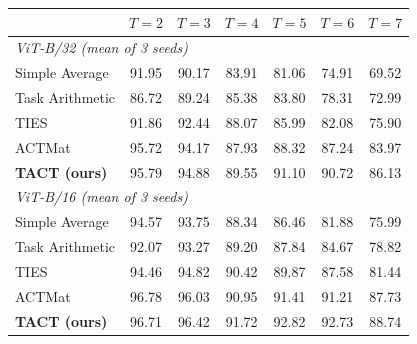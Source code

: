 \begin{tabular}{lcccccc}
\toprule
 & $T=2$ & $T=3$ & $T=4$ & $T=5$ & $T=6$ & $T=7$ \\
\midrule
\multicolumn{7}{l}{\emph{ViT-B/32 (mean of 3 seeds)}} \\
Simple Average & 91.95 & 90.17 & 83.91 & 81.06 & 74.91 & 69.52 \\
Task Arithmetic & 86.72 & 89.24 & 85.38 & 83.80 & 78.31 & 72.99 \\
TIES & 91.86 & 92.44 & 88.07 & 85.99 & 82.08 & 75.90 \\
ACTMat & 95.72 & 94.17 & 87.93 & 88.32 & 87.24 & 83.97 \\
\textbf{TACT (ours)} & 95.79 & 94.88 & 89.55 & 91.10 & 90.72 & 86.13 \\
\midrule
\multicolumn{7}{l}{\emph{ViT-B/16 (mean of 3 seeds)}} \\
Simple Average & 94.57 & 93.75 & 88.34 & 86.46 & 81.88 & 75.99 \\
Task Arithmetic & 92.07 & 93.27 & 89.20 & 87.84 & 84.67 & 78.82 \\
TIES & 94.46 & 94.82 & 90.42 & 89.87 & 87.58 & 81.44 \\
ACTMat & 96.78 & 96.03 & 90.95 & 91.41 & 91.21 & 87.73 \\
\textbf{TACT (ours)} & 96.71 & 96.42 & 91.72 & 92.82 & 92.73 & 88.74 \\
\bottomrule
\end{tabular}
